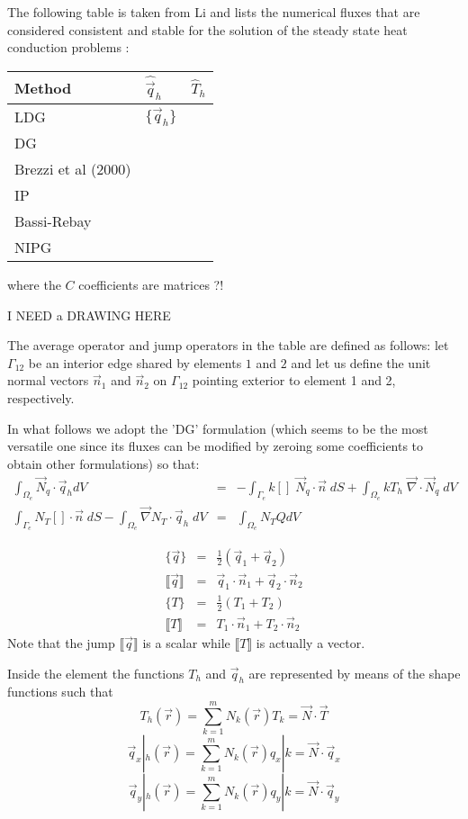 The following table is taken from Li \cite{li06} and lists the numerical fluxes 
that are considered consistent and stable for the solution of the steady state heat conduction 
problems \cite{arbc02,cacp00}:
\begin{center}
\begin{tabular}{lll}
\hline
Method & $\hat{\vec{q}}_h$ & $\hat{T}_h$ \\
\hline
LDG \cite{cosh98} & $\{ \vec{q}_h \}$  & \\
DG  \cite{cacp00} & \\
Brezzi et al (2000) \cite{brmm00} &\\
IP \cite{dodu76} & \\
Bassi-Rebay \cite{barm97} &\\
NIPG \cite{riwg99} & \\
\hline
\end{tabular}
\end{center}
where the $C$ coefficients are matrices ?!

I NEED a DRAWING HERE

The average operator and jump operators in the table are defined as follows:
let $\Gamma_{12}$ be an interior edge shared by elements $1$ and $2$ and let us 
define the unit normal vectors $\vec{n}_1$ and $\vec{n}_2$ on $\Gamma_{12}$ 
pointing exterior to element 1 and 2, respectively.

In what follows we adopt the 'DG' formulation (which seems to be the most versatile one
since its fluxes can be modified by zeroing some coefficients to obtain other formulations)
so that:
\begin{eqnarray}
\int_{\Omega_e} \vec{N}_q \cdot  \vec q_h dV &=& 
-\int_{\Gamma_e} k \left[    \right] \;  \vec{N}_q \cdot \vec{n} \; dS 
+ \int _{\Omega_e}  k T_h \;  \vec\nabla\cdot \vec{N}_q  \;  dV \\
\int_{\Gamma_e}    {N}_T \left[   \right] \cdot \vec{n}  \; dS
- \int_{\Omega_e} \vec\nabla N_T \cdot \vec{q}_h \; dV 
&=& \int_{\Omega_e} N_T Q dV
\end{eqnarray}


\begin{eqnarray}
\{ \vec{q} \} &=& \frac{1}{2} (\vec{q}_1 + \vec{q}_2) \\
\llbracket \vec{q} \rrbracket  &=& \vec{q}_1 \cdot\vec{n}_1 + \vec{q}_2\cdot\vec{n}_2 \\
\{ T \} &=& \frac{1}{2} (T_1 + T_2) \\
\llbracket T \rrbracket &=& T_1\cdot\vec{n}_1 + T_2\cdot\vec{n}_2 
\end{eqnarray}
Note that the jump $ \llbracket \vec{q} \rrbracket$ is a scalar while 
$\llbracket T \rrbracket $ is actually a vector. 

Inside the element the functions $T_h$ and $\vec{q}_h$ are represented by means 
of the shape functions such that
\[
T_h(\vec{r}) = \sum_{k=1}^m N_k(\vec{r}) T_k = \vec{N} \cdot \vec{T}
\]
\[
\vec{q}_x|_h(\vec{r}) = \sum_{k=1}^m N_k(\vec{r}) q_x|k = \vec{N}\cdot\vec{q}_x
\]
\[
\vec{q}_y|_h(\vec{r}) = \sum_{k=1}^m N_k(\vec{r}) q_y|k = \vec{N}\cdot\vec{q}_y
\]

